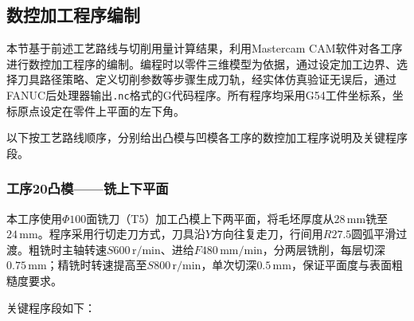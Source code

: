 \documentclass{xautCADreport}
\begin{document}
\subsection{数控加工程序编制}

本节基于前述工艺路线与切削用量计算结果，利用Mastercam CAM软件对各工序进行数控加工程序的编制。编程时以零件三维模型为依据，通过设定加工边界、选择刀具路径策略、定义切削参数等步骤生成刀轨，经实体仿真验证无误后，通过FANUC后处理器输出\texttt{.nc}格式的G代码程序。所有程序均采用G54工件坐标系，坐标原点设定在零件上平面的左下角。

以下按工艺路线顺序，分别给出凸模与凹模各工序的数控加工程序说明及关键程序段。

\subsubsection{工序20凸模——铣上下平面}

本工序使用$\Phi100$面铣刀（T5）加工凸模上下两平面，将毛坯厚度从$28\,\mathrm{mm}$铣至$24\,\mathrm{mm}$。程序采用行切走刀方式，刀具沿$Y$方向往复走刀，行间用$R27.5$圆弧平滑过渡。粗铣时主轴转速$S600\,\mathrm{r/min}$、进给$F480\,\mathrm{mm/min}$，分两层铣削，每层切深$0.75\,\mathrm{mm}$；精铣时转速提高至$S800\,\mathrm{r/min}$，单次切深$0.5\,\mathrm{mm}$，保证平面度与表面粗糙度要求。

关键程序段如下：
\end{document}

